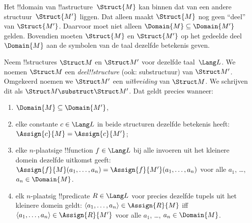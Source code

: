 \documentclass[openany]{memoir}
\begin{document}
\begingroup
\def\olfilename{OLP-0185}
\def\olfilepath{content/model-theory/basics/}
\hypertarget{unit-OLP-0185}{}




Het !!{domain} van !!a{structure}~$\Struct{M}$ kan binnen dat van een
andere structuur~$\Struct{M'}$ liggen.  Dat alleen maakt $\Struct{M}$
nog geen ``deel'' van $\Struct{M'}$.  Daarvoor moet niet alleen
$\Domain{M} \subseteq \Domain{M'}$ gelden.  Bovendien moeten
$\Struct{M}$ en $\Struct{M'}$ op het gedeelde deel~$\Domain{M}$ aan
de symbolen van de taal dezelfde betekenis geven.

\begin{defn}
Neem !!{structure}s $\Struct M$ en $\Struct M'$ voor dezelfde
taal~$\Lang L$.  We noemen $\Struct M$ een \emph{deel!!{structure}}
(ook: substructuur) van $\Struct M'$.  Omgekeerd noemen we $\Struct M'$
een \emph{uitbreiding} van $\Struct M$.  We schrijven dit als
$\Struct M \substruct \Struct M'$.  Dat geldt precies wanneer:
\begin{enumerate}
\item $\Domain{M} \subseteq \Domain{M'}$,
\item elke constante $c \in \Lang L$ in beide structuren dezelfde
  betekenis heeft: $\Assign{c}{M} =
    \Assign{c}{M'}$;
\item elke $n$-plaatsige !!{function} $f \in \Lang L$ bij alle
  invoeren uit het kleinere domein dezelfde uitkomst geeft:
  $\Assign{f}{M}(a_1, \dots, a_n) = \Assign{f}{M'}(a_1, \dots, a_n)$
  voor alle $a_1$, \dots, $a_n \in \Domain{M}$.
\item elk $n$-plaatsig !!{predicate} $R \in \Lang L$ voor precies
  dezelfde tupels uit het kleinere domein geldt: $\langle
  a_1, \dots, a_n\rangle \in \Assign{R}{M}$ iff $\langle a_1, \dots,
  a_n\rangle \in \Assign{R}{M'}$ voor alle $a_1$, \dots, $a_n \in
  \Domain{M}$.
\end{enumerate}
\end{defn}
\end{document}
